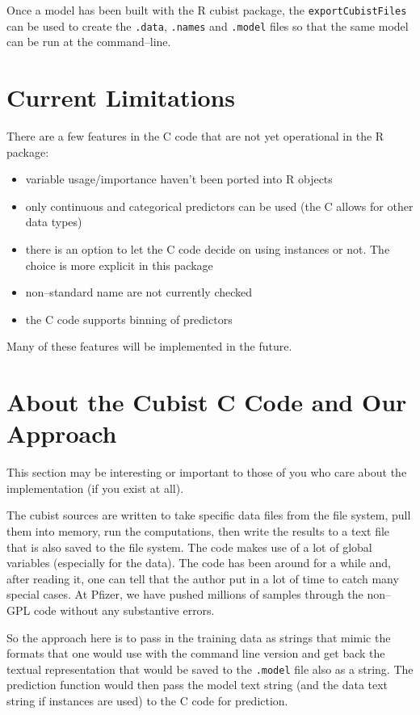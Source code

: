\documentclass[12pt]{article}
\newcommand{\code}[1]{\mbox{\footnotesize\color{darkblue}\texttt{#1}}}
\newcommand{\pkg}[1]{{\fontseries{b}\selectfont #1}}
\renewcommand{\pkg}[1]{{\textsf{#1}}}
\begin{document}
Once a model has been built with the \pkg{R} \pkg{cubist} package, the \code{exportCubistFiles} can be used to create the \texttt{.data}, \texttt{.names} and \texttt{.model} files so that the same model can be run at the command--line.


\section{Current Limitations}

There are a few features in the \pkg{C} code that are not yet operational in the \pkg{R} package:
\begin{itemize}

  \item variable usage/importance haven't been ported into R objects
  \item only continuous and categorical predictors can be used (the \pkg{C} allows for other data types)
  \item there is an option to let the \pkg{C} code decide on using instances or not. The choice is more explicit in this package
  \item non--standard name are not currently checked
  \item the \pkg{C} code supports binning of predictors
\end{itemize}
Many of these features will be implemented in the future.


\section{About the Cubist C Code and Our Approach}

This section may be interesting or important to those of you who care about the implementation (if you exist at all).

The cubist sources are written to take specific data files from the file system,
pull them into memory, run the computations, then write the results to a text
file that is also saved to the file system. The code makes use of a lot of global variables (especially for the data). 
The code has been around for a while and, after reading it, one can tell
that the author put in a lot of time to catch many special cases. At Pfizer, we have
pushed millions of samples through the non--GPL code without any substantive errors.

So the approach here is to pass in the training data as strings that mimic
the formats that one would use with the command line version and get back the
textual representation that would be saved to the \texttt{.model} file also as a string.
The prediction function would then pass the model text string (and the data text
string if instances are used) to the C code for prediction.
\end{document}
